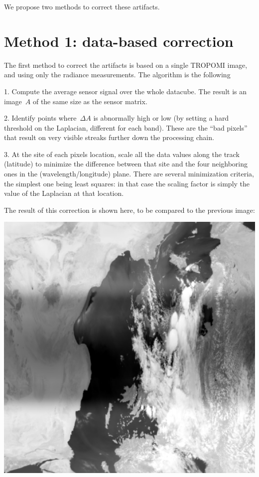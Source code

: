 \documentclass[a4paper]{article}    %
\theoremstyle{note}
\theoremstyle{plain}
\begin{document}
We propose two methods to correct these artifacts.

\clearpage
\section{Method 1: data-based correction}

The first method to correct the artifacts is based on a single TROPOMI image,
and using only the radiance measurements.  The algorithm is the following

1. Compute the average sensor signal over the whole datacube.  The result is
an image~$A$ of the same size as the sensor matrix.

2. Identify points where~$\Delta A$ is abnormally high or low (by setting a
hard threshold on the Laplacian, different for each band).  These are the
``bad pixels'' that result on very visible streaks further down the
processing chain.

3. At the site of each pixels location, scale all the data values along the
track (latitude) to minimize the difference between that site and the
four neighboring ones in the (wavelength/longitude) plane.  There are several
minimization criteria, the simplest one being least squares: in that case the
scaling factor is simply the value of the Laplacian at that location.

The result of this correction is shown here, to be compared to the previous
image:

\includegraphics[width=0.8\linewidth]{f/corrected_r6_288_log.png}
\end{document}
